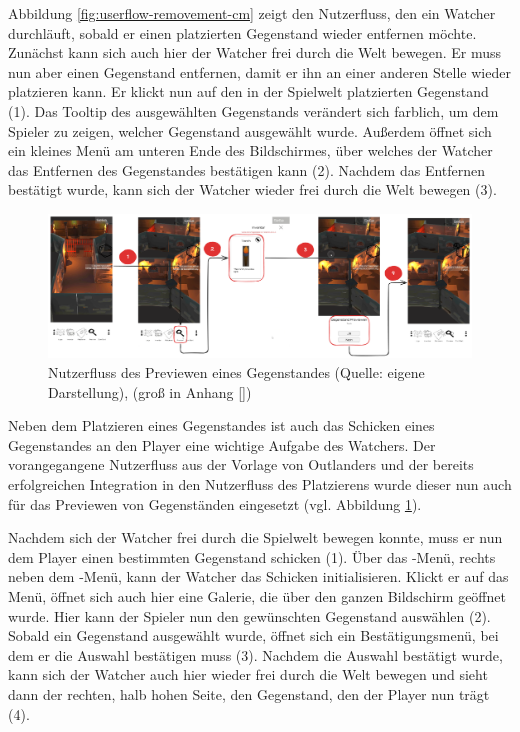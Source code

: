 Abbildung \ref{fig:userflow-removement-cm} zeigt den Nutzerfluss, den ein Watcher durchläuft, sobald er einen platzierten Gegenstand wieder entfernen möchte. Zunächst kann sich auch hier der Watcher frei durch die Welt bewegen. Er muss nun aber einen Gegenstand entfernen, damit er ihn an einer anderen Stelle wieder platzieren kann. Er klickt nun auf den in der Spielwelt platzierten Gegenstand (1). Das Tooltip des ausgewählten Gegenstands verändert sich farblich, um dem Spieler zu zeigen, welcher Gegenstand ausgewählt wurde. Außerdem öffnet sich ein kleines Menü am unteren Ende des Bildschirmes, über welches der Watcher das Entfernen des Gegenstandes bestätigen kann (2). Nachdem das Entfernen bestätigt wurde, kann sich der Watcher wieder frei durch die Welt bewegen (3).

\begin{figure}[ht]
\centering
\includegraphics[width=1\linewidth]{content/pictures/PreviewFlow.png}
\caption{Nutzerfluss des Previewen eines Gegenstandes (Quelle: eigene Darstellung), (groß in Anhang \ref{})}
\label{fig:userflow-preview-cm}
\end{figure}

Neben dem Platzieren eines Gegenstandes ist auch das Schicken eines Gegenstandes an den Player eine wichtige Aufgabe des Watchers. Der vorangegangene Nutzerfluss aus der Vorlage von Outlanders und der bereits erfolgreichen Integration in den Nutzerfluss des Platzierens wurde dieser nun auch für das Previewen von Gegenständen eingesetzt (vgl. Abbildung \ref{fig:userflow-preview-cm}).

Nachdem sich der Watcher frei durch die Spielwelt bewegen konnte, muss er nun dem Player einen bestimmten Gegenstand schicken (1). Über das -Menü, rechts neben dem -Menü, kann der Watcher das Schicken initialisieren. Klickt er auf das Menü, öffnet sich auch hier eine Galerie, die über den ganzen Bildschirm geöffnet wurde. Hier kann der Spieler nun den gewünschten Gegenstand auswählen (2). Sobald ein Gegenstand ausgewählt wurde, öffnet sich ein Bestätigungsmenü, bei dem er die Auswahl bestätigen muss (3). Nachdem die Auswahl bestätigt wurde, kann sich der Watcher auch hier wieder frei durch die Welt bewegen und sieht dann der rechten, halb hohen Seite, den Gegenstand, den der Player nun trägt (4).

